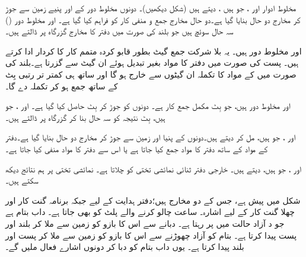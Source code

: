  مخلوط ادوار  اور   ، جو  ہیں  ، دیتے ہیں (شکل  دیکھیں)۔ دونوں مخلوط دور کے  اور  پنیے زمین سے جوڑ کر   مخارج دو حال بنایا گیا ہے۔دو حال مخارج جمع و منفی کار کو فراہم کیا گیا ہے۔  اور  مخلوط دور ()     سہ حال    سوئچ  ہیں جو بلند  کی صورت میں دفتر  کا مخارج   گزرگاہ پر ڈالتے ہیں۔

 اور  مخلوط دور  ہیں۔ یہ بلا شرکت جمع گیٹ بطور قابو  کردہ  متمم کار  کا کردار ادا کرتے ہیں۔ پست  کی صورت میں  دفتر  کا مواد بغیر تبدیل ہوئے ان  گیٹ سے گزرتا ہے۔بلند  کی صورت میں   کے مواد کا  تکملہ   ان گیٹوں سے خارج ہو گا اور ساتھ ہی کمتر تر  رتبی بِٹ کے ساتھ  جمع ہو کر تکملہ  دے گا۔

 اور  مخلوط دور  ہیں، جو  بِٹ  مکمل جمع کار ہے۔ دونوں کو جوڑ کر   بِٹ  حاصل کیا گیا ہے۔  اور ، جو  ہیں،  بِٹ نتیجہ کو سہ حال بنا کر   گزرگاہ پر ڈالتے ہیں۔

 اور ، جو  ہیں، مل کر  دیتے ہیں۔دونوں کے پنیا  اور  زمین سے جوڑ کر مخارج دو حال بنایا گیا ہے۔دفتر   کے مواد کے ساتھ  دفتر  کا مواد جمع کیا جاتا ہے یا اس سے دفتر  کا مواد  منفی کیا جاتا ہے۔

 اور  ، جو  ہیں،  دیتے ہیں۔ خارجی دفتر ثنائی  نمائشی تختی کو  چلاتا ہے۔ نمائشی تختی پر ہم نتائج دیکھ سکتے ہیں۔

شکل  میں  پیش ہے، جس کے دو مخارج ہیں؛دفتر  ہدایت  کے لیے   جبکہ برنامہ گنت کار اور چھلا گنت کار کے لیے  اشارہ۔  ساعت چالو کرنے والے پلٹ  کو بھی جاتا ہے۔  داب بتام ہے جو د آزاد حالت میں  پر رہتا ہے۔ دبانے سے  اس کا بازو       کو زمین سے ملا کر بلند  اور پست  پیدا کرتا ہے۔ بتام کو آزاد چھوڑنے سے اس کا بازو  کو زمین سے ملا کر پست  اور بلند  پیدا کرتا ہے۔ یوں داب  بتام  کو دبا کر دونوں اشارے فعال  ملیں گے۔


